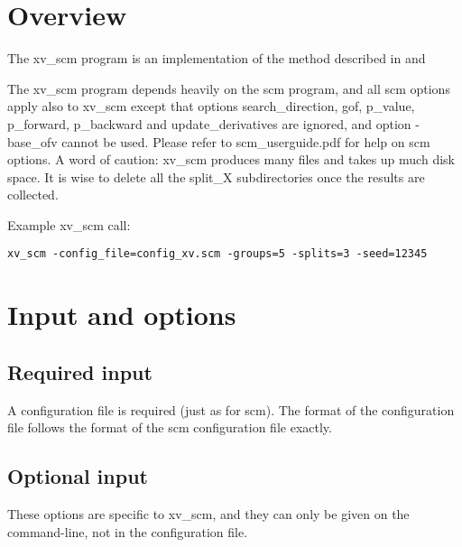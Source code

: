 



\maketitle


\section{Overview}
The xv\_scm program is an implementation of the method described in \cite{Katsube1} and \cite{Katsube2} 

The xv\_scm program
depends heavily on the scm program, and all scm options apply also to xv\_scm except that options search\_direction, gof, p\_value, p\_forward, p\_backward and update\_derivatives are ignored,
and option -base\_ofv cannot be used. Please refer to scm\_userguide.pdf for help on scm options.
A word of caution: xv\_scm produces many files and takes up much disk space. It is wise to delete all the split\_X subdirectories once the results are collected.

Example xv\_scm call:
\begin{verbatim}
xv_scm -config_file=config_xv.scm -groups=5 -splits=3 -seed=12345
\end{verbatim}

\section{Input and options}

\subsection{Required input}
A configuration file is required (just as for scm).  The format of the configuration file follows the format of the scm configuration file exactly.

\subsection{Optional input}

These options are specific to xv\_scm, and they can only be given on the command-line, not in the configuration file.

